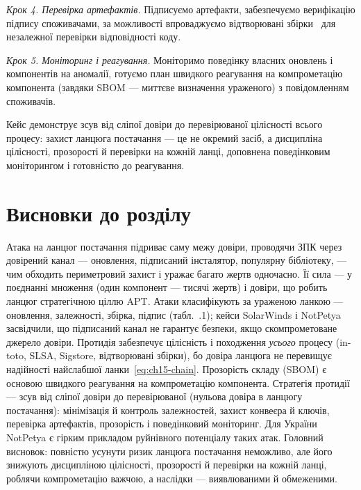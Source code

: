 \emph{Крок 4. Перевірка артефактів.} Підписуємо артефакти, забезпечуємо верифікацію підпису споживачами, за можливості впроваджуємо відтворювані збірки~\cite{ch15:reproducible} для незалежної перевірки відповідності коду.

\emph{Крок 5. Моніторинг і реагування.} Моніторимо поведінку власних оновлень і компонентів на аномалії, готуємо план швидкого реагування на компрометацію компонента (завдяки SBOM --- миттєве визначення ураженого) з повідомленням споживачів.

Кейс демонструє зсув від сліпої довіри до перевірюваної цілісності всього процесу: захист ланцюга постачання --- це не окремий засіб, а дисципліна цілісності, прозорості й перевірки на кожній ланці, доповнена поведінковим моніторингом і готовністю до реагування.

\section*{Висновки до розділу}

Атака на ланцюг постачання підриває саму межу довіри, проводячи ЗПК через довірений канал --- оновлення, підписаний інсталятор, популярну бібліотеку, --- чим обходить периметровий захист і уражає багато жертв одночасно. Її сила --- у поєднанні множення (один компонент --- тисячі жертв) і довіри, що робить ланцюг стратегічною ціллю APT. Атаки класифікують за ураженою ланкою --- оновлення, залежності, збірка, підпис (табл.~\thechapter.1); кейси SolarWinds і NotPetya засвідчили, що підписаний канал не гарантує безпеки, якщо скомпрометоване джерело довіри. Протидія забезпечує цілісність і походження \emph{усього} процесу (in-toto, SLSA, Sigstore, відтворювані збірки), бо довіра ланцюга не перевищує надійності найслабшої ланки~\eqref{eq:ch15-chain}. Прозорість складу (SBOM) є основою швидкого реагування на компрометацію компонента. Стратегія протидії --- зсув від сліпої довіри до перевірюваної (нульова довіра в ланцюгу постачання): мінімізація й контроль залежностей, захист конвеєра й ключів, перевірка артефактів, прозорість і поведінковий моніторинг. Для України NotPetya є гірким прикладом руйнівного потенціалу таких атак. Головний висновок: повністю усунути ризик ланцюга постачання неможливо, але його знижують дисципліною цілісності, прозорості й перевірки на кожній ланці, роблячи компрометацію важчою, а наслідки --- виявлюваними й обмеженими.

